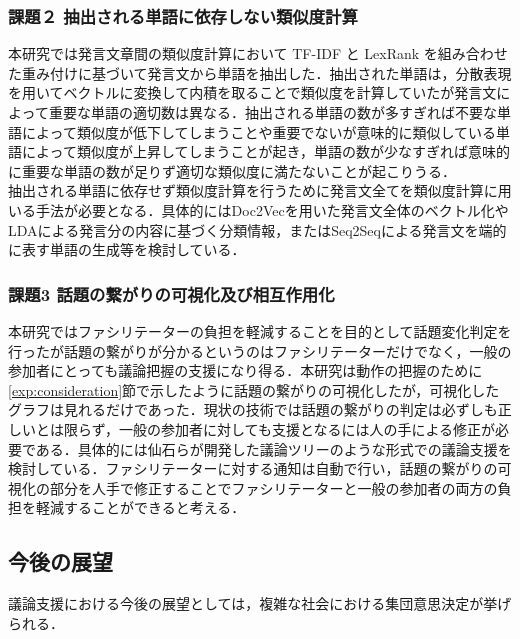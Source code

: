 \subsubsection*{課題２ 抽出される単語に依存しない類似度計算}
本研究では発言文章間の類似度計算において TF-IDF と LexRank を組み合わせた重み付けに基づいて発言文から単語を抽出した．抽出された単語は，分散表現を用いてベクトルに変換して内積を取ることで類似度を計算していたが発言文によって重要な単語の適切数は異なる．抽出される単語の数が多すぎれば不要な単語によって類似度が低下してしまうことや重要でないが意味的に類似している単語によって類似度が上昇してしまうことが起き，単語の数が少なすぎれば意味的に重要な単語の数が足りず適切な類似度に満たないことが起こりうる．
\\
抽出される単語に依存せず類似度計算を行うために発言文全てを類似度計算に用いる手法が必要となる．具体的にはDoc2Vec\cite{doc2vec2014}を用いた発言文全体のベクトル化やLDAによる発言分の内容に基づく分類情報，またはSeq2Seq\cite{seq2seq2014}による発言文を端的に表す単語の生成等を検討している．

\subsubsection*{課題3 話題の繋がりの可視化及び相互作用化}
本研究ではファシリテーターの負担を軽減することを目的として話題変化判定を行ったが話題の繋がりが分かるというのはファシリテーターだけでなく，一般の参加者にとっても議論把握の支援になり得る．本研究は動作の把握のために\ref{exp:consideration}節で示したように話題の繋がりの可視化したが，可視化したグラフは見れるだけであった．現状の技術では話題の繋がりの判定は必ずしも正しいとは限らず，一般の参加者に対しても支援となるには人の手による修正が必要である．具体的には仙石らが開発した議論ツリーのような形式での議論支援を検討している．ファシリテーターに対する通知は自動で行い，話題の繋がりの可視化の部分を人手で修正することでファシリテーターと一般の参加者の両方の負担を軽減することができると考える．

\subsection{今後の展望}
\label{con:future}
議論支援における今後の展望としては，複雑な社会における集団意思決定が挙げられる．

